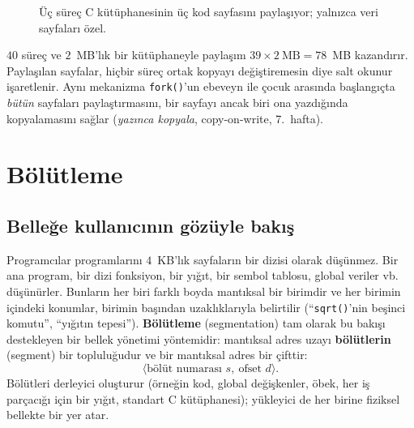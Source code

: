 \documentclass[11pt,a4paper]{article}
\newcommand{\term}[1]{\textbf{\color{mintdeep}#1}}
\newcommand{\cmd}[1]{\texttt{#1}}
\begin{document}
\begin{figure}[H]
\centering
{}
\caption{Üç süreç C kütüphanesinin üç kod sayfasını paylaşıyor; yalnızca veri sayfaları özel.}
\end{figure}

$40$ süreç ve $2$~MB'lık bir kütüphaneyle paylaşım $39 \times 2\ \text{MB} = 78$~MB kazandırır. Paylaşılan sayfalar, hiçbir süreç ortak kopyayı değiştiremesin diye salt okunur işaretlenir. Aynı mekanizma \cmd{fork()}'un ebeveyn ile çocuk arasında başlangıçta \emph{bütün} sayfaları paylaştırmasını, bir sayfayı ancak biri ona yazdığında kopyalamasını sağlar (\emph{yazınca kopyala}, copy-on-write, 7.~hafta).

\section{Bölütleme}

\subsection{Belleğe kullanıcının gözüyle bakış}

Programcılar programlarını $4$~KB'lık sayfaların bir dizisi olarak düşünmez. Bir ana program, bir dizi fonksiyon, bir yığıt, bir sembol tablosu, global veriler vb. düşünürler. Bunların her biri farklı boyda mantıksal bir birimdir ve her birimin içindeki konumlar, birimin başından uzaklıklarıyla belirtilir (``\cmd{sqrt()}'nin beşinci komutu'', ``yığıtın tepesi''). \term{Bölütleme} (segmentation) tam olarak bu bakışı destekleyen bir bellek yönetimi yöntemidir: mantıksal adres uzayı \term{bölütlerin} (segment) bir topluluğudur ve bir mantıksal adres bir çifttir:
\[
\langle \text{bölüt numarası } s,\ \text{ofset } d \rangle .
\]
Bölütleri derleyici oluşturur (örneğin kod, global değişkenler, öbek, her iş parçacığı için bir yığıt, standart C kütüphanesi); yükleyici de her birine fiziksel bellekte bir yer atar.
\end{document}
